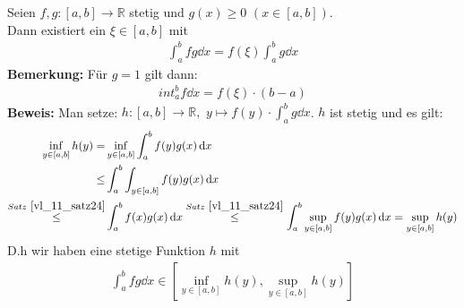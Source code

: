 \begin{Satz}{
	Seien $f,g: [a,b] \rightarrow \mathbb{R}$ stetig und 
	$g(x) \geq 0$ $(x \in[a,b])$. \\
	Dann existiert ein $\xi \in [a,b]$ mit 
	\begin{align*}
		\int_a^b f g \dd{x} = f(\xi) \int_a^b g\dd{x}
	\end{align*}
	\textbf{Bemerkung:}
	Für $g = 1$ gilt dann: 
	\begin{align*}
		int_a^b f \dd{x} = f(\xi) \cdot (b-a)
	\end{align*}
	\textbf{Beweis:} Man setze: $h: [a,b] \rightarrow \mathbb{R},$ $y \mapsto f(y) 
	\cdot \int_a^b g \dd{x}$. $h$ ist stetig und es gilt:
	\begin{align*}
		\inf_{y \in [a,b]} h(y) = & \inf_{y \in [a,b]} \int_a^b f(y) g(x) \dd{x} \\
		\leq & \int_a^b \int_{y \in [a,b]} f(y) g(x) \dd{x} \\
		 \overset{Satz~\ref{vl_11_satz24}}{\le} & \int_a^bf(x)g(x) \dd{x} 
		\overset{Satz~\ref{vl_11_satz24}}{\le}
		\int_a^b \sup_{y \in [a,b]} f(y) g(x) \dd{x} = \sup_{y \in [a,b]} h(y)
	\end{align*}
	D.h wir haben eine stetige Funktion $h$ mit 
	\begin{align*}
		\int_a^b fg\dd{x} \in [\inf_{y \in [a,b]} h(y),  \sup_{y \in [a,b]} h(y)]
	\end{align*}
	
}\end{Satz}